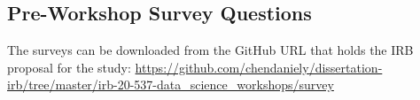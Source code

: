 \documentclass[030-workshop.tex]{subfiles}
\begin{document}
\subsection{Pre-Workshop Survey Questions}
\label{sse:preworkshop-survey-questions}

The surveys can be downloaded from the GitHub URL that holds the IRB proposal for the study:
\url{https://github.com/chendaniely/dissertation-irb/tree/master/irb-20-537-data\_science_workshops/survey}
\end{document}
